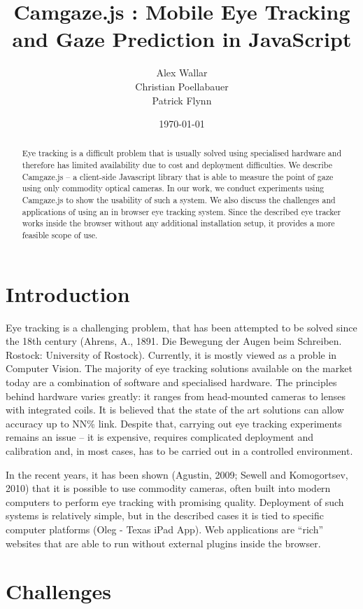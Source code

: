 \documentclass[annual]{acmsiggraph}
\title{Camgaze.js : Mobile Eye Tracking and Gaze Prediction in JavaScript}
\author{Alex Wallar \\ Christian Poellabauer \\ Patrick Flynn}
\date{\today}
\begin{document}
\maketitle

\begin{abstract}
Eye tracking is a difficult problem that is usually solved using specialised
hardware and therefore has limited availability due to cost and deployment
difficulties. We describe Camgaze.js – a client-side Javascript library that
is able to measure the point of gaze using only commodity optical cameras.
In our work, we conduct experiments using Camgaze.js to show the usability
of such a system. We also discuss the challenges and applications of using
an in browser eye tracking system. Since the described eye tracker works
inside the browser without any additional installation setup, it provides
a more feasible scope of use.
\end{abstract}

\section{Introduction}

Eye tracking is a challenging problem, that has been attempted to be solved
since the 18th century (Ahrens, A., 1891. Die Bewegung der Augen beim Schreiben.
Rostock: University of Rostock). Currently, it is mostly viewed as a proble
in Computer Vision.
The majority of eye tracking solutions available on the market today are a combination
of software and specialised hardware. The principles behind hardware varies greatly:
it ranges from head-mounted cameras to lenses with integrated coils. It is believed
that the state of the art solutions can allow accuracy up to NN\% {link}. Despite that,
carrying out eye tracking experiments remains an issue – it is expensive, requires
complicated deployment and calibration and, in most cases, has to be carried out
in a controlled environment.

In the recent years, it has been shown (Agustin, 2009; Sewell and Komogortsev, 2010)
that it is possible to use commodity cameras, often built into modern computers to
perform eye tracking with promising quality. Deployment of such systems is relatively 
simple, but in the described cases it is tied to specific computer platforms (Oleg - Texas iPad App).
Web applications are “rich” websites that are able to run without external plugins inside the browser. 

\section{Challenges}
\end{document}
